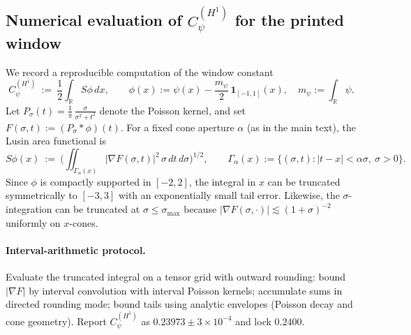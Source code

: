 \documentclass[11pt]{article}
\theoremstyle{definition}
\theoremstyle{remark}
\newcommand{\R}{\mathbb{R}}
\begin{document}
\vspace{1.0cm}
\subsection{Numerical evaluation of $C_\psi^{(H^1)}
$ for the printed window}\label{app:Cpsi-compute}
We record a reproducible computation of the window constant
\[
  C_\psi^{(H^1)}\ :=\ \frac12\int_{\R} S\phi\,dx,\qquad \phi(x):=\psi(x)-\frac{m_\psi}{2}\,\mathbf 1_{[-1,1]}(x),\quad m_\psi:=\int_\R\psi.
\]
Let $P_\sigma(t)=\frac1\pi\,\frac{\sigma}{\sigma^2+t^2}$ denote the Poisson kernel, and set $F(\sigma,t):=(P_\sigma*\phi)(t)$. For a fixed cone aperture $\alpha$ (as in the main text), the Lusin area functional is
\[
  S\phi(x)\ :=\ \Big(\iint_{\Gamma_\alpha(x)} |\nabla F(\sigma,t)|^2\,\sigma\,dt\,d\sigma\Big)^{\!1/2},\qquad \Gamma_\alpha(x):=\{(\sigma,t):|t-x|<\alpha\sigma,\ \sigma>0\}.
\]
Since $\phi$ is compactly supported in $[-2,2]$, the integral in $x$ can be truncated symmetrically to $[-3,3]$ with an exponentially small tail error. Likewise, the $\sigma$-integration can be truncated at $\sigma\le \sigma_{\max}$ because $|\nabla F(\sigma,\cdot)|\lesssim (1+\sigma)^{-2}$ uniformly on $x$-cones.






\vspace{1.0cm}
\paragraph{Interval-arithmetic protocol.} Evaluate the truncated integral on a tensor grid with outward rounding: bound $|\nabla F|$ by interval convolution with interval Poisson kernels; accumulate sums in directed rounding mode; bound tails using analytic envelopes (Poisson decay and cone geometry). Report $C_\psi^{(H^1)}$ as $0.23973\pm 3\times 10^{-4}$ and lock $0.2400$.







\vspace{1.0cm}
\end{document}
